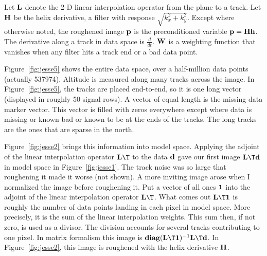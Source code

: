 Let $\bold L$ denote the 2-D linear interpolation operator
from the plane to a track.
Let $\bold H$ be the helix derivative,
a filter with response $\sqrt{k_x^2+k_y^2}$.
Except where otherwise noted,
the roughened image $\bold p$ is the preconditioned variable
$\bold p =\bold H \bold h$.
The derivative along a track in data space is $\frac{d}{ dt}$.
$\bold W$ is a weighting function that vanishes when any filter hits a track end or a bad data point.
\par
Figure~\ref{fig:jesse5} shows the entire data space,
over a half-million data points (actually 537974).
Altitude is measured along many tracks across the image.
In Figure~\ref{fig:jesse5}, the tracks are placed end-to-end,
so it is one long vector (displayed in roughly 50 signal rows).
A vector of equal length is the missing data marker vector.
This vector is filled with zeros everywhere except where
data is missing or known bad or known to be at the ends of the tracks.
The long tracks are the ones that are sparse in the north.
\par
Figure~\ref{fig:jesse2} brings this information into model space.
Applying the adjoint of the linear interpolation operator $\bold L\T$
to the data $\bold d$ gave our first image $\bold L\T\bold d$
in model space in Figure~\ref{fig:jesse1}.
The track noise was so large that roughening it made it worse (not shown).
A more inviting image arose when I normalized the image before roughening it.
Put a vector of all ones $\bold 1$ into the
adjoint of the linear interpolation operator $\bold L\T$.
What comes out $\bold L\T\bold 1$
is roughly the number of data points landing in each pixel in model space.
More precisely,
it is the sum of the linear interpolation weights.
This sum then, if not zero, is used as a divisor.
The division accounts for several tracks contributing to one pixel.
In matrix formalism this image is
${\bf diag}(\bold L\T\bold 1)^{-1} \bold L\T\bold d$.
In Figure~\ref{fig:jesse2},
this image is roughened with the helix derivative $\bold H$.
